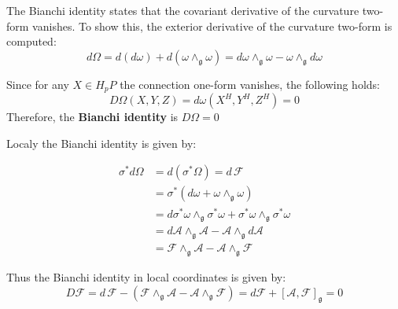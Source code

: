 The Bianchi identity states that the covariant derivative of the curvature two-form vanishes. To show this, the exterior derivative of the curvature two-form is computed:
\[ d\Omega = d(d\omega) + d(\omega \wedge_\mathfrak{g} \omega) = d\omega \wedge_\mathfrak{g} \omega - \omega \wedge_\mathfrak{g} d\omega  \]

Since for any $X \in H_pP$ the connection one-form vanishes, the following holds:
\[ D\Omega(X,Y,Z) = d\omega(X^H,Y^H,Z^H) = 0 \]
Therefore, the \textbf{Bianchi identity} is \( D\Omega=0 \)

Localy the Bianchi identity is given by:

\begin{align*}
  \sigma^*d\Omega &= d(\sigma^*\Omega) = d\,\mathscr{F} \\
  &= \sigma^*(d\omega + \omega \wedge_\mathfrak{g} \omega) \\
    &= d\sigma^*\omega \wedge_\mathfrak{g} \sigma^*\omega + \sigma^*\omega \wedge_\mathfrak{g} \sigma^*\omega \\
    &= d\mathcal{A} \wedge_\mathfrak{g} \mathcal{A} - \mathcal{A}\wedge_\mathfrak{g}d\mathcal{A} \\
    &= \mathscr{F}\wedge_\mathfrak{g} \mathcal{A} - \mathcal{A} \wedge_\mathfrak{g} \mathscr{F}
\end{align*}

Thus the Bianchi identity in local coordinates is given by:
\[ D\mathscr{F} = d\,\mathscr{F} - (\mathscr{F}\wedge_\mathfrak{g} \mathcal{A} - \mathcal{A} \wedge_\mathfrak{g} \mathscr{F}) = d\mathscr{F} + [\mathcal{A},\mathscr{F}]_\mathfrak{g} = 0 \]
